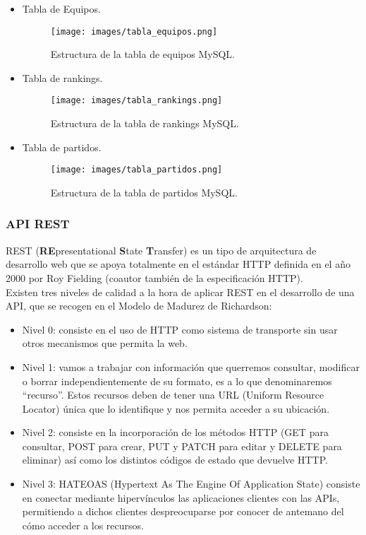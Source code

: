 \begin{itemize}
	\item Tabla de Equipos.
	\begin{figure}[H]
		\centering
		\texttt{[image: images/tabla\_equipos.png]}
		\caption{Estructura de la tabla de equipos MySQL.}
	\end{figure}
	\item Tabla de rankings.
	\begin{figure}[H]
		\centering
		\texttt{[image: images/tabla\_rankings.png]}
		\caption{Estructura de la tabla de rankings MySQL.}
	\end{figure}	
	\item Tabla de partidos.
	\begin{figure}[H]
		\centering
		\texttt{[image: images/tabla\_partidos.png]}
		\caption{Estructura de la tabla de partidos MySQL.}
	\end{figure}
\end{itemize}

\subsubsection{API REST}
REST (\textbf{RE}presentational \textbf{S}tate \textbf{T}ransfer) es un tipo de arquitectura de desarrollo web que se apoya totalmente en el estándar HTTP definida en el año 2000 por Roy Fielding (coautor también de la especificación HTTP). \\

Existen tres niveles de calidad a la hora de aplicar REST en el desarrollo de una API, que se recogen en el Modelo de Madurez de Richardson\cite{refapi1}\cite{refapi2}:
\begin{itemize}
	\item Nivel 0: consiste en el uso de HTTP como sistema de transporte sin usar otros mecanismos que permita la web.
	\item Nivel 1: vamos a trabajar con información que querremos consultar, modificar o borrar independientemente de su formato, es a lo que denominaremos ``recurso''. Estos recursos deben de tener una URL (Uniform Resource Locator) única que lo identifique y nos permita acceder a su ubicación.
	\item Nivel 2: consiste en la incorporación de los métodos HTTP (GET para consultar, POST para crear, PUT y PATCH para editar y DELETE para eliminar) así como los distintos códigos de estado que devuelve HTTP.
	\item Nivel 3: HATEOAS (Hypertext As The Engine Of Application State) consiste en conectar mediante hipervínculos las aplicaciones clientes con las APIs, permitiendo a dichos clientes despreocuparse por conocer de antemano del cómo acceder a los recursos.
\end{itemize}

